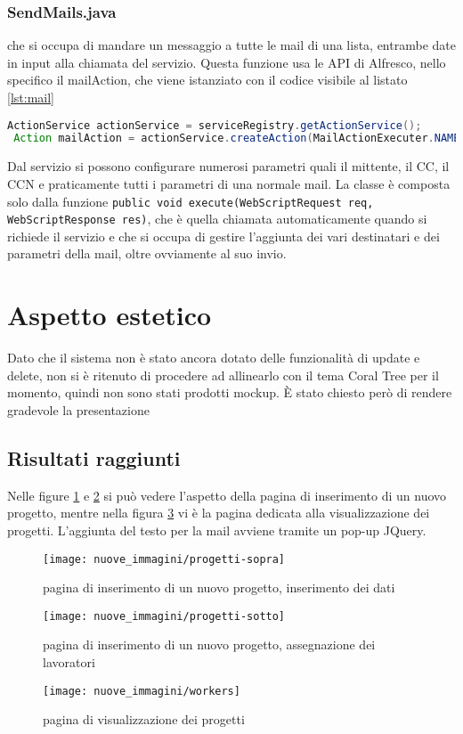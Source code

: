 \subsubsection{SendMails.java} che si occupa di mandare un messaggio a tutte le mail di una lista, entrambe date in input alla chiamata del servizio. Questa funzione usa le \gls{API} di Alfresco, nello specifico il mailAction, che viene istanziato con il codice visibile al listato \ref{lst:mail}
\begin{lstlisting}[language=Java,caption=set dell'actionservice per le mail,label=lst:mail]
 ActionService actionService = serviceRegistry.getActionService();
 Action mailAction = actionService.createAction(MailActionExecuter.NAME);
\end{lstlisting}
Dal servizio si possono configurare numerosi parametri quali il mittente, il CC, il CCN e praticamente tutti i parametri di una normale mail.
La classe è composta solo dalla funzione \texttt{public void execute(WebScriptRequest req, WebScriptResponse res)}, che è quella chiamata automaticamente quando si richiede il servizio e che si occupa di gestire l'aggiunta dei vari destinatari e dei parametri della mail, oltre ovviamente al suo invio.
\section{Aspetto estetico}
Dato che il sistema non è stato ancora dotato delle funzionalità di update e delete, non si è ritenuto di procedere ad allinearlo con il tema Coral Tree per il momento, quindi non sono stati prodotti mockup. È stato chiesto però di rendere gradevole la presentazione
\subsection{Risultati raggiunti}
Nelle figure \ref{fig:progetti-sopra} e \ref{fig:progetti-sotto} si può vedere l'aspetto della pagina di inserimento di un nuovo progetto, mentre nella figura \ref{fig:workers} vi è la pagina dedicata alla visualizzazione dei progetti. L'aggiunta del testo per la mail avviene tramite un pop-up JQuery.
\begin{figure}[!ht]
\centering
\texttt{[image: nuove\_immagini/progetti-sopra]}
\caption{pagina di inserimento di un nuovo progetto, inserimento dei dati\label{fig:progetti-sopra}}
\end{figure}
\begin{figure}[!ht]
\centering
\texttt{[image: nuove\_immagini/progetti-sotto]}
\caption{pagina di inserimento di un nuovo progetto, assegnazione dei lavoratori \label{fig:progetti-sotto}}
\end{figure}
\begin{figure}[!ht]
\centering
\texttt{[image: nuove\_immagini/workers]}
\caption{pagina di visualizzazione dei progetti \label{fig:workers}}
\end{figure}